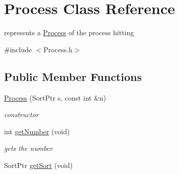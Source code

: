 \hypertarget{classProcess}{\section{Process Class Reference}
\label{classProcess}
}


represents a \hyperlink{classProcess}{Process} of the process hitting  




{\ttfamily \#include $<$Process.\+h$>$}

\subsection*{Public Member Functions}
\begin{DoxyCompactItemize}
\item 
\hyperlink{classProcess_a267617e8f2cfd994e0527635372be90c}{Process} (Sort\+Ptr s, const int \&n)
\begin{DoxyCompactList}\small\item\em constructor \end{DoxyCompactList}\item 
\hypertarget{classProcess_acdfa357f41df6f1e09cdffbc5c5b2c3b}{int \hyperlink{classProcess_acdfa357f41df6f1e09cdffbc5c5b2c3b}{get\+Number} (void)}\label{classProcess_acdfa357f41df6f1e09cdffbc5c5b2c3b}

\begin{DoxyCompactList}\small\item\em gets the number \end{DoxyCompactList}\item 
\hypertarget{classProcess_aaabe803350e1d6dcc23d8aa4ff2314db}{Sort\+Ptr \hyperlink{classProcess_aaabe803350e1d6dcc23d8aa4ff2314db}{get\+Sort} (void)}\label{classProcess_aaabe803350e1d6dcc23d8aa4ff2314db}


\end{DoxyCompactItemize}
